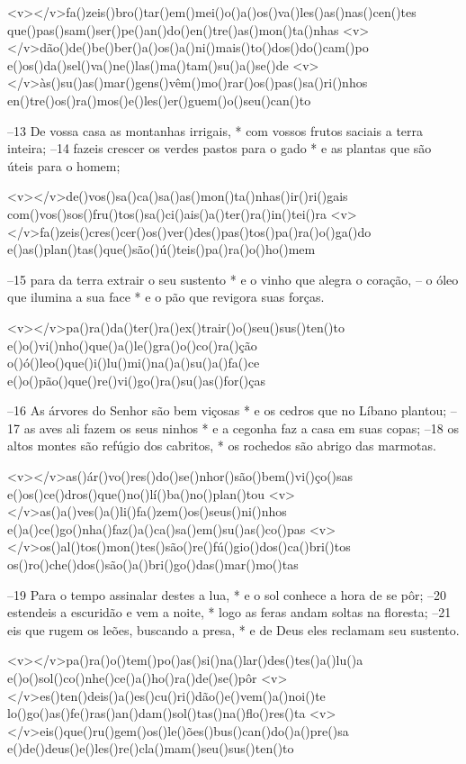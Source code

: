 <v></v>fa()zeis()bro()tar()em()mei()o()a()os()va()les()as()nas()cen()tes
que()pas()sam()ser()pe()an()do()en()tre()as()mon()ta()nhas
<v></v>dão()de()be()ber()a()os()a()ni()mais()to()dos()do()cam()po
e()os()da()sel()va()ne()las()ma()tam()su()a()se()de
<v></v>às()su()as()mar()gens()vêm()mo()rar()os()pas()sa()ri()nhos
en()tre()os()ra()mos()e()les()er()guem()o()seu()can()to

–13 De vossa casa as montanhas irrigais, *
com vossos frutos saciais a terra inteira; 
–14 fazeis crescer os verdes pastos para o gado *
e as plantas que são úteis para o homem;

<v></v>de()vos()sa()ca()sa()as()mon()ta()nhas()ir()ri()gais
com()vos()sos()fru()tos()sa()ci()ais()a()ter()ra()in()tei()ra
<v></v>fa()zeis()cres()cer()os()ver()des()pas()tos()pa()ra()o()ga()do
e()as()plan()tas()que()são()ú()teis()pa()ra()o()ho()mem

–15 para da terra extrair o seu sustento *
e o vinho que alegra o coração, 
– o óleo que ilumina a sua face *
e o pão que revigora suas forças.

<v></v>pa()ra()da()ter()ra()ex()trair()o()seu()sus()ten()to
e()o()vi()nho()que()a()le()gra()o()co()ra()ção
o()ó()leo()que()i()lu()mi()na()a()su()a()fa()ce
e()o()pão()que()re()vi()go()ra()su()as()for()ças

–16 As árvores do Senhor são bem viçosas *
e os cedros que no Líbano plantou; 
–17 as aves ali fazem os seus ninhos *
e a cegonha faz a casa em suas copas; 
–18 os altos montes são refúgio dos cabritos, *
os rochedos são abrigo das marmotas.

<v></v>as()ár()vo()res()do()se()nhor()são()bem()vi()ço()sas
e()os()ce()dros()que()no()lí()ba()no()plan()tou
<v></v>as()a()ves()a()li()fa()zem()os()seus()ni()nhos
e()a()ce()go()nha()faz()a()ca()sa()em()su()as()co()pas
<v></v>os()al()tos()mon()tes()são()re()fú()gio()dos()ca()bri()tos
os()ro()che()dos()são()a()bri()go()das()mar()mo()tas

–19 Para o tempo assinalar destes a lua, *
e o sol conhece a hora de se pôr; 
–20 estendeis a escuridão e vem a noite, *
logo as feras andam soltas na floresta; 
–21 eis que rugem os leões, buscando a presa, *
e de Deus eles reclamam seu sustento.

<v></v>pa()ra()o()tem()po()as()si()na()lar()des()tes()a()lu()a
e()o()sol()co()nhe()ce()a()ho()ra()de()se()pôr
<v></v>es()ten()deis()a()es()cu()ri()dão()e()vem()a()noi()te
lo()go()as()fe()ras()an()dam()sol()tas()na()flo()res()ta
<v></v>eis()que()ru()gem()os()le()ões()bus()can()do()a()pre()sa
e()de()deus()e()les()re()cla()mam()seu()sus()ten()to

